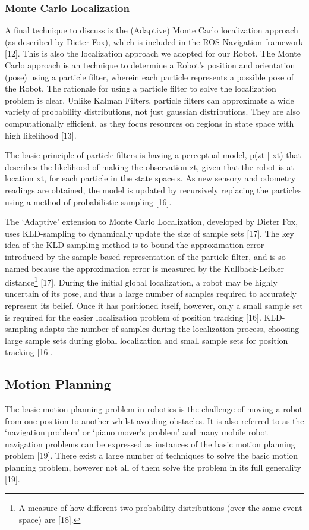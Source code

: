 \documentclass{article}
\begin{document}
	\subsubsection{Monte Carlo Localization}
	A final technique to discuss is the (Adaptive) Monte Carlo localization approach (as described by Dieter Fox),  which is included in the ROS Navigation framework [12]. This is also the localization approach we adopted for our Robot. The Monte Carlo approach is an technique to determine a Robot’s position and orientation (pose) using a particle filter,  wherein each particle represents a possible pose of the Robot. The rationale for using a  particle filter to solve the localization problem is clear. Unlike Kalman Filters, particle filters can approximate a wide variety of probability distributions, not just gaussian distributions. They are also computationally efficient, as they focus resources on regions in state space with high likelihood [13]. 

The basic principle of particle filters is having a perceptual model, p(zt | xt) that describes the likelihood of making the observation zt, given that the robot is at location xt, for each particle in the state space s. As new sensory and odometry readings are obtained, the model is updated by recursively replacing the particles using a method of probabilistic sampling [16].  

The ‘Adaptive’ extension to Monte Carlo Localization, developed by Dieter Fox, uses KLD-sampling to dynamically update the size of sample sets [17]. The key idea of the KLD-sampling method is to bound the approximation error introduced by the sample-based representation of the particle filter, and is so named because the approximation error is measured by the Kullback-Leibler distance\footnote{A measure of how different two probability distributions (over the same event space) are [18].} [17]. During the initial global localization, a robot may be highly uncertain of its pose, and thus a large number of samples required to accurately represent its belief. Once it has positioned itself, however, only a small sample set is required for the easier localization problem of position tracking [16]. KLD-sampling adapts the number of samples during the localization process, choosing large sample sets during global localization and small sample sets for position tracking [16].

	\subsection{Motion Planning}
	The basic motion planning problem in robotics is the challenge of moving a robot from one position to another whilst avoiding obstacles. It is also referred to as the ‘navigation problem’ or ‘piano mover’s problem’ and many mobile robot navigation problems can be expressed as instances of the basic motion planning problem [19]. There exist a large number of techniques to solve the basic motion planning problem, however not all of them solve the problem in its full generality [19]. 
\end{document}
